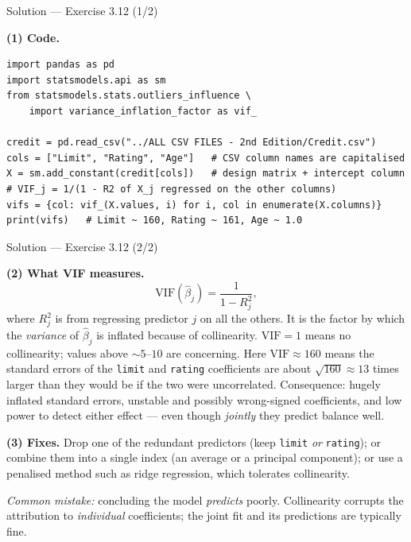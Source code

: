 \documentclass[aspectratio=169,11pt]{beamer}
\begin{document}
\begin{frame}[fragile]{Solution --- Exercise 3.12 (1/2)}
  \begin{solutionbox}
    \textbf{(1) Code.}
\begin{lstlisting}
import pandas as pd
import statsmodels.api as sm
from statsmodels.stats.outliers_influence \
    import variance_inflation_factor as vif_

credit = pd.read_csv("../ALL CSV FILES - 2nd Edition/Credit.csv")
cols = ["Limit", "Rating", "Age"]   # CSV column names are capitalised
X = sm.add_constant(credit[cols])   # design matrix + intercept column
# VIF_j = 1/(1 - R2 of X_j regressed on the other columns)
vifs = {col: vif_(X.values, i) for i, col in enumerate(X.columns)}
print(vifs)   # Limit ~ 160, Rating ~ 161, Age ~ 1.0
\end{lstlisting}
  \end{solutionbox}
\end{frame}

\begin{frame}{Solution --- Exercise 3.12 (2/2)}
  \begin{solutionbox}
    \textbf{(2) What VIF measures.}
    \[
      \mathrm{VIF}(\hat\beta_j)=\frac{1}{1-R_j^2},
    \]
    where $R_j^2$ is from regressing predictor $j$ on all the others. It
    is the factor by which the \emph{variance} of $\hat\beta_j$ is
    inflated because of collinearity. $\mathrm{VIF}=1$ means no
    collinearity; values above $\sim5$--$10$ are concerning. Here
    $\mathrm{VIF}\approx 160$ means the standard errors of the
    \texttt{limit} and \texttt{rating} coefficients are about
    $\sqrt{160}\approx 13$ times larger than they would be if the two
    were uncorrelated. Consequence: hugely inflated standard errors,
    unstable and possibly wrong-signed coefficients, and low power to
    detect either effect --- even though \emph{jointly} they predict
    balance well.

    \textbf{(3) Fixes.} Drop one of the redundant predictors (keep
    \texttt{limit} \emph{or} \texttt{rating}); or combine them into a single
    index (an average or a principal component); or use a penalised method
    such as ridge regression, which tolerates collinearity.

    \medskip
    \textit{Common mistake:} concluding the model \emph{predicts} poorly.
    Collinearity corrupts the attribution to \emph{individual} coefficients;
    the joint fit and its predictions are typically fine.
  \end{solutionbox}
\end{frame}
\end{document}
